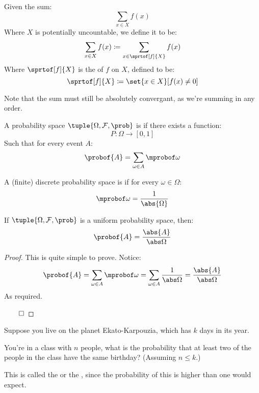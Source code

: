 \begin{note}

Given the sum:
\[ \sum_{x\in X}f(x) \]
Where $X$ is potentially uncountable, we define it to be:
\[ \sum_{x\in X} f(x) \coloneqq \sum_{x\in\sprtof[f]{X}} f(x) \]
Where $\sprtof[f]{X}$ is the  of $f$ on $X$, defined to be:
\[ \sprtof[f]{X}\coloneqq\set{x\in X}[f(x)\neq0] \]

Note that the sum must still be absolutely convergant, as we're summing in any order.

\end{note}

\begin{defn*}

A probability space $\tuple{\Omega, \cF, \prob}$ is  if there exists a function:
\[ P\colon\Omega\longrightarrow[0,1] \]
Such that for every event $A$:
\[ \probof{A} = \sum_{\omega\in A}\mprobof\omega \]

\end{defn*}

\begin{defn*}

A (finite) discrete probability space is  if for every $\omega\in\Omega$:
\[ \mprobof\omega=\frac1{\abs{\Omega}} \]

\end{defn*}

\begin{prop*}

If $\tuple{\Omega,\cF,\prob}$ is a uniform probability space, then:
\[ \probof{A} = \frac{\abs{A}}{\abs\Omega} \]

\end{prop*}

\begin{proof}

This is quite simple to prove.
Notice:
\[ \probof{A} = \sum_{\omega\in A}\mprobof\omega = \sum_{\omega\in A}\frac1{\abs\Omega} = \frac{\abs{A}}{\abs\Omega} \]
As required.

\hfill$\qed$

\end{proof}

\newpage
\begin{exam}

Suppose you live on the planet Ekato-Karpouzia, which has $k$ days in its year.

You're in a class with $n$ people, what is the probability that at least two of the people in the class have the same
birthday? (Assuming $n\leq k$.)

This is called the  or the , since the probability of this is higher
than one would expect.

\end{exam}


